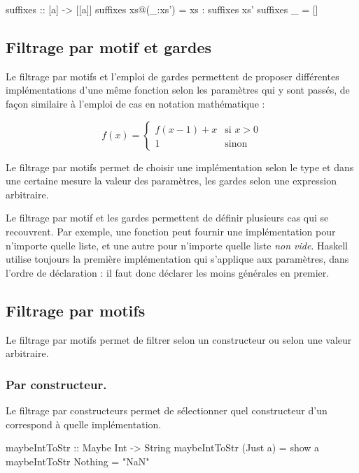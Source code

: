\begin{haskellcode}
suffixes :: [a] -> [[a]]
suffixes xs@(_:xs') = xs : suffixes xs'
suffixes _ = []
\end{haskellcode}

\subsection{Filtrage par motif et gardes}

Le filtrage par motifs et l'emploi de gardes permettent de proposer différentes implémentations d'une même fonction selon les paramètres qui y sont passés, de façon similaire à l'emploi de cas en notation mathématique :

\[
 f(x) =
  \begin{cases}
   f(x-1) + x & \text{si } x > 0 \\
   1          & \text{sinon}
  \end{cases}
\]

Le filtrage par motifs permet de choisir une implémentation selon le type et dans une certaine mesure la valeur des paramètres, les gardes selon une expression arbitraire.

\begin{infobox}
Le filtrage par motif et les gardes permettent de définir plusieurs cas qui se recouvrent. Par exemple, une fonction peut fournir une implémentation pour n'importe quelle liste, et une autre pour n'importe quelle liste \emph{non vide}. Haskell utilise toujours la première implémentation qui s'applique aux paramètres, dans l'ordre de déclaration : il faut donc déclarer les moins générales en premier.
\end{infobox}

\subsection{Filtrage par motifs}
\label{pattern-matching}

Le filtrage par motifs permet de filtrer selon un constructeur ou selon une valeur arbitraire.

\subsubsection{Par constructeur.} Le filtrage par constructeurs permet de sélectionner quel constructeur d'un  correspond à quelle implémentation.

\begin{haskellcode}
maybeIntToStr :: Maybe Int -> String
maybeIntToStr (Just a) = show a
maybeIntToStr Nothing  = "NaN"
\end{haskellcode}

